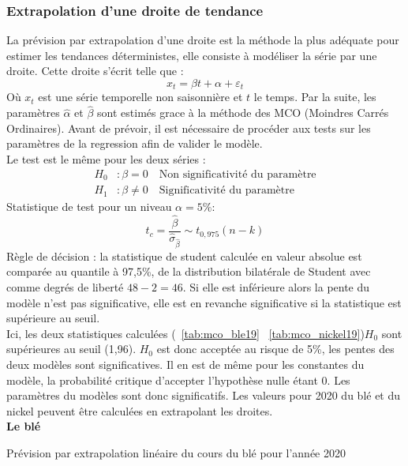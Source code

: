\subsubsection*{Extrapolation d'une droite de tendance} 
La prévision par extrapolation d'une droite est la méthode la plus adéquate pour estimer les tendances déterministes, elle consiste à modéliser la série par une droite.
Cette droite s'écrit telle que :
\begin{equation*}
    x_{t} = \beta t + \alpha + \varepsilon_{t}
\end{equation*}
Où $x_{t}$ est une série temporelle non saisonnière et $t$ le temps. Par la suite, les paramètres $\hat{\alpha}$ et $\hat{\beta}$ sont estimés grace à la méthode des MCO 
(Moindres Carrés Ordinaires). Avant de prévoir, il est nécessaire de procéder aux tests sur les paramètres de la regression afin de valider le modèle.\\[11pt]
Le test est le même pour les deux séries :
\begin{equation*}
    \begin{split}
        H_{0} &: \beta = 0     \quad \text{Non significativité du paramètre} \\
        H_{1} &: \beta \neq 0  \quad \text{Significativité du paramètre}
    \end{split}
\end{equation*}
Statistique de test pour un niveau $\alpha = 5\%$:
\begin{equation*}
    t_{c} = \frac{\hat{\beta}}{\hat{\sigma}_{\hat{\beta}}}\sim t_{0,975}(n-k)
\end{equation*}
Règle de décision : la statistique de student calculée en valeur absolue est comparée au quantile à 97,5\%, de la distribution bilatérale de Student avec comme 
degrés de liberté $48 - 2 = 46$. Si elle est inférieure alors la pente du modèle n'est pas significative, elle est en revanche significative si la statistique est 
supérieure au seuil.\\[11pt]
Ici, les deux statistiques calculées (~\ref{tab:mco_ble19} ~\ref{tab:mco_nickel19})$H_{0}$ sont supérieures au seuil (1,96). $H_{0}$ est donc acceptée au risque de 5\%, 
les pentes des deux modèles sont significatives. Il en est de même pour les constantes du modèle, la probabilité critique d'accepter l'hypothèse nulle étant 0. Les 
paramètres du modèles sont donc significatifs. Les valeurs pour 2020 du blé et du nickel peuvent être calculées en extrapolant les droites.\\[11pt]
\textbf{Le blé} 
\begin{table}[H]
    \centering
    \caption{Prévision par extrapolation linéaire du cours du blé pour l'année 2020}
    \sffamily
    
\end{table}
